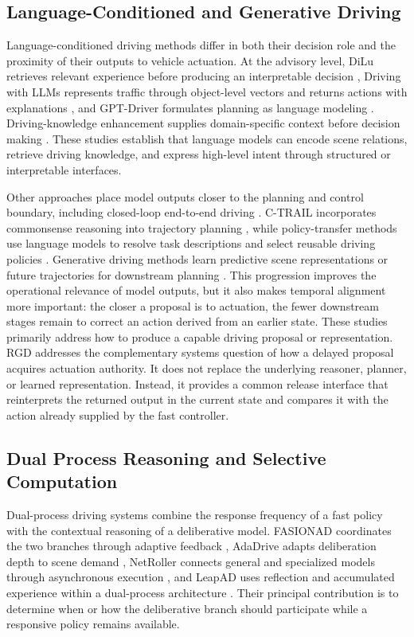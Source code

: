 \documentclass[letterpaper,journal]{IEEEtran}
\begin{document}
\subsection{Language-Conditioned and Generative Driving}
Language-conditioned driving methods differ in both their decision role and the
proximity of their outputs to vehicle actuation. At the advisory level, DiLu
retrieves relevant experience before producing an interpretable decision
\cite{wen2024dilu}, Driving with LLMs represents traffic through object-level
vectors and returns actions with explanations \cite{chen2024drivingllms}, and
GPT-Driver formulates planning as language modeling \cite{mao2023gptdriver}.
Driving-knowledge enhancement supplies domain-specific context before decision
making \cite{tvtDrivingKnowledge2026}. These studies establish that language
models can encode scene relations, retrieve driving knowledge, and express
high-level intent through structured or interpretable interfaces.

Other approaches place model outputs closer to the planning and control
boundary, including closed-loop end-to-end driving \cite{shao2024lmdrive}.
C-TRAIL incorporates commonsense reasoning into trajectory planning
\cite{tvtCtrail2026}, while policy-transfer methods use language models to
resolve task descriptions and select reusable driving policies
\cite{titsPolicyTransfer2025}. Generative driving methods learn predictive
scene representations or future trajectories for downstream planning
\cite{wang2024drivedreamer,min2024driveworld,zheng2024genad,
liao2025diffusiondrive}. This progression improves the operational relevance of
model outputs, but it also makes temporal alignment more important: the closer
a proposal is to actuation, the fewer downstream stages remain to correct an
action derived from an earlier state. These studies primarily address how to produce a capable driving
proposal or representation. RGD addresses the complementary systems question
of how a delayed proposal acquires actuation authority. It does not replace the
underlying reasoner, planner, or learned representation. Instead, it provides a
common release interface that reinterprets the returned output in the current
 state and compares it with the action already supplied by the fast controller.
\subsection{Dual Process Reasoning and Selective Computation}
Dual-process driving systems combine the response frequency of a fast policy
with the contextual reasoning of a deliberative model. FASIONAD coordinates
the two branches through adaptive feedback \cite{qian2024fasionad}, AdaDrive
adapts deliberation depth to scene demand \cite{zhang2025adadrive}, NetRoller
connects general and specialized models through asynchronous execution
\cite{xin2026netroller}, and LeapAD uses reflection and accumulated experience
within a dual-process architecture \cite{mei2024leapad}. Their principal
contribution is to determine when or how the deliberative branch should
participate while a responsive policy remains available.
\end{document}
